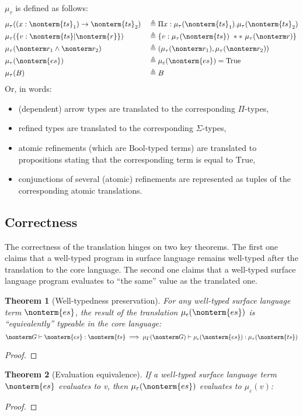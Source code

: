 \documentclass[a4paper]{article}
\newtheorem{theorem}{Theorem}
\begin{document}
$\mu_\tau$ is defined as follows:
\begin{equation}
\begin{aligned}
  & \mu_\tau( (x : \nonterm{ts}_1) \rightarrow \nonterm{ts}_2)  && \triangleq \Pi x : \mu_\tau(\nonterm{ts}_1). \mu_\tau(\nonterm{ts}_2)  \\
  & \mu_\tau( \{ v : \nonterm{ts} | \nonterm{r} \})             && \triangleq \{ v : \mu_\tau(\nonterm{ts})\ **\ \mu_\tau(\nonterm r) \}  \\
  & \mu_\tau( \nonterm r_1 \land \nonterm r_2 )                 && \triangleq ( \mu_\tau(\nonterm r_1) , \mu_\tau(\nonterm r_2))          \\
  & \mu_\tau( \nonterm{es} )                                    && \triangleq \mu_\varepsilon(\nonterm{es}) = \text{True}                 \\
  & \mu_\tau(B)                                                 && \triangleq B                                                           \\
\end{aligned}
\end{equation}
Or, in words:
\begin{itemize}
  \item (dependent) arrow types are translated to the corresponding $\Pi$-types,
  \item refined types are translated to the corresponding $\Sigma$-types,
  \item atomic refinements (which are $\text{Bool}$-typed terms) are translated to propositions stating that the corresponding term is equal to $\text{True}$,
  \item conjunctions of several (atomic) refinements are represented as tuples of the corresponding atomic translations.
\end{itemize}

\subsection{Correctness}

The correctness of the translation hinges on two key theorems.
The first one claims that a well-typed program in surface language remains well-typed after the translation to the core language.
The second one claims that a well-typed surface language program evaluates to ``the same'' value as the translated one.

\begin{theorem}[Well-typedness preservation]
  For any well-typed surface language term $\nonterm{es}$,
  the result of the translation $\mu_\epsilon(\nonterm{es})$ is ``equivalently'' typeable in the core language:
  \[
    \nonterm G \vdash \nonterm{es} : \nonterm{ts} \implies \mu_\Gamma(\nonterm G) \vdash \mu_\epsilon(\nonterm{es}) : \mu_\tau(\nonterm{ts})
  \]
\end{theorem}
\begin{proof}
\end{proof}

\begin{theorem}[Evaluation equivalence]
  If a well-typed surface language term $\nonterm{es}$ evaluates to v, then $\mu_\varepsilon(\nonterm{es})$ evaluates to $\mu_\varepsilon(v)$:
\end{theorem}
\begin{proof}
\end{proof}
\end{document}

